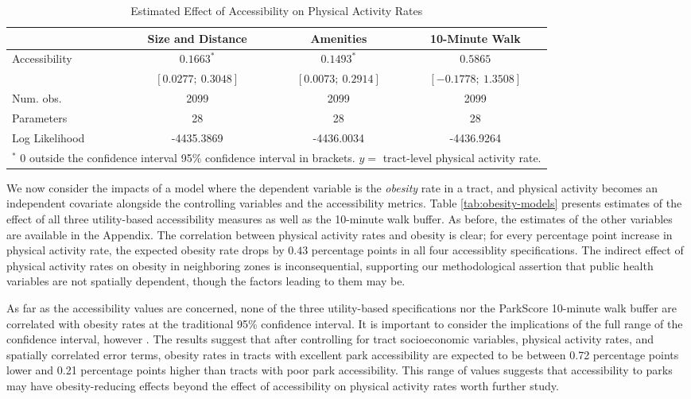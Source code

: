 \documentclass[shortAfour,sageh.bst]{sagej}
\begin{document}
\begin{table*}
\caption{Estimated Effect of Accessibility on Physical Activity Rates}
\label{tab:pa-models}

\begin{tabular}{l c c c }
\toprule
 & Size and Distance & Amenities & 10-Minute Walk \\
\midrule
Accessibility  & $0.1663^{*}$        & $0.1493^{*}$        & $0.5865$             \\
               & $[0.0277;\ 0.3048]$ & $[0.0073;\ 0.2914]$ & $[-0.1778;\ 1.3508]$ \\
\midrule
Num. obs.      & 2099                & 2099                & 2099                 \\
Parameters     & 28                  & 28                  & 28                   \\
Log Likelihood & -4435.3869          & -4436.0034          & -4436.9264           \\
\bottomrule
\multicolumn{4}{l}{\scriptsize{$^*$ 0 outside the confidence interval 95\% confidence interval in brackets.  $y = $ tract-level physical activity rate.}}
\end{tabular}
\end{table*}

We now consider the impacts of a model where the dependent variable is
the \emph{obesity} rate in a tract, and physical activity becomes an
independent covariate alongside the controlling variables and the
accessibility metrics. Table \ref{tab:obesity-models} presents estimates
of the effect of all three utility-based accessibility measures as well
as the 10-minute walk buffer. As before, the estimates of the other
variables are available in the Appendix. The correlation between
physical activity rates and obesity is clear; for every percentage point
increase in physical activity rate, the expected obesity rate drops by
\(0.43\) percentage points in all four accessiblity specifications. The
indirect effect of physical activity rates on obesity in neighboring
zones is inconsequential, supporting our methodological assertion that
public health variables are not spatially dependent, though the factors
leading to them may be.

As far as the accessibility values are concerned, none of the three
utility-based specifications nor the ParkScore 10-minute walk buffer are
correlated with obesity rates at the traditional 95\% confidence
interval. It is important to consider the implications of the full range
of the confidence interval, however \citep{Amrhein2019}. The results
suggest that after controlling for tract socioeconomic variables,
physical activity rates, and spatially correlated error terms, obesity
rates in tracts with excellent park accessibility are expected to be
between 0.72 percentage points lower and 0.21 percentage points higher
than tracts with poor park accessibility. This range of values suggests
that accessibility to parks may have obesity-reducing effects beyond the
effect of accessibility on physical activity rates worth further study.
\end{document}
